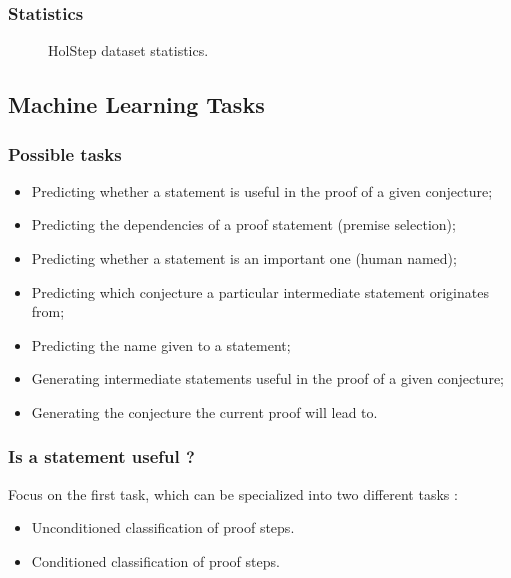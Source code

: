 \documentclass[11pt,handout]{beamer}
\begin{document}
\begin{frame}
  \frametitle{Statistics}
    \begin{figure}[h]
    \centering
    \caption{HolStep dataset statistics.}
  \end{figure}
\end{frame}

\subsection[ML Tasks]{Machine Learning Tasks}

\begin{frame}
  \frametitle{Possible tasks}
  \begin{itemize}
  \item Predicting whether a statement is useful in the proof of a given conjecture;
  \item Predicting the dependencies of a proof statement (premise selection);
  \item Predicting whether a statement is an important one (human named);
  \item Predicting which conjecture a particular intermediate statement originates from;
  \item Predicting the name given to a statement;
  \item Generating intermediate statements useful in the proof of a given conjecture;
  \item Generating the conjecture the current proof will lead to. 
  \end{itemize}
\end{frame}

\begin{frame}
  \frametitle{Is a statement useful ?}
  Focus on the first task, which can be specialized into two different tasks :
  \begin{itemize}
  \item Unconditioned classification of proof steps.
  \item Conditioned classification of proof steps.
  \end{itemize}

\end{frame}
\end{document}
